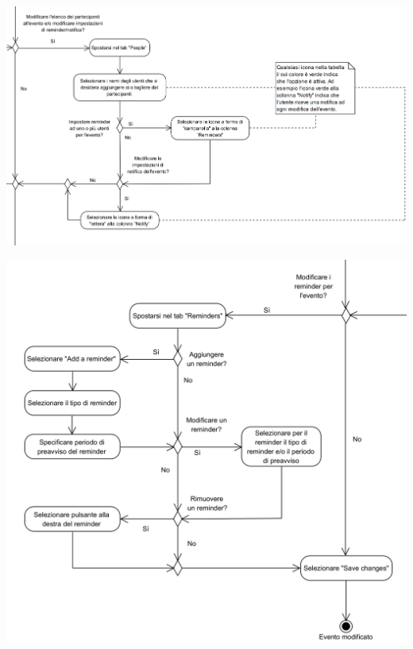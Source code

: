 \begin{center}
	\includegraphics[width=15cm]{../../documenti/NormeDiProgetto/DiagrammiProcedure/EditEventi3.png}
\end{center}

\begin{center}
	\includegraphics[width=15cm]{../../documenti/NormeDiProgetto/DiagrammiProcedure/EditEventi4.png}
\end{center}

\newpage
